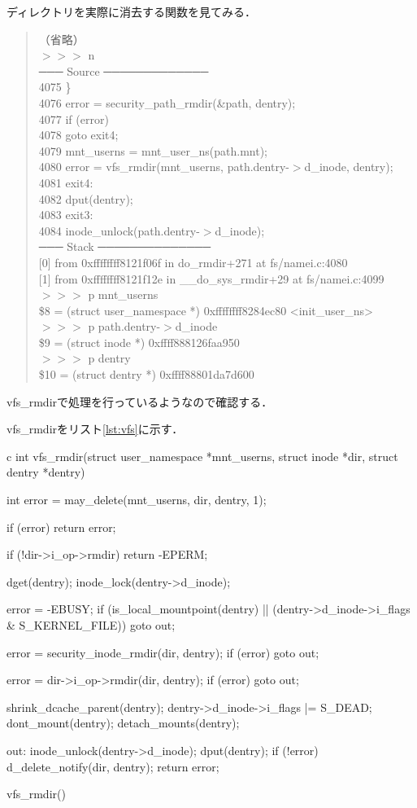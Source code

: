 ディレクトリを実際に消去する関数を見てみる．
\begin{quote}
（省略） \\
$>>>$ n \\
─── Source ─────────────
\\
 4075      \} \\
 4076      error = security\_path\_rmdir(\&path, dentry); \\
 4077      if (error) \\
 4078          goto exit4; \\
 4079      mnt\_userns = mnt\_user\_ns(path.mnt); \\
 4080      error = vfs\_rmdir(mnt\_userns, path.dentry-$>$d\_inode, dentry); \\
 4081  exit4: \\
 4082      dput(dentry); \\
 4083  exit3: \\
 4084      inode\_unlock(path.dentry-$>$d\_inode); \\
─── Stack ──────────────
\\
{[0]} from 0xffffffff8121f06f in do\_rmdir+271 at fs/namei.c:4080 \\
{[1]} from 0xffffffff8121f12e in \_\_do\_sys\_rmdir+29 at fs/namei.c:4099 \\
$>>>$ p mnt\_userns \\
\$8 = (struct user\_namespace *) 0xffffffff8284ec80 <init\_user\_ns> \\
$>>>$ p path.dentry-$>$d\_inode \\
\$9 = (struct inode *) 0xffff888126faa950 \\
$>>>$ p dentry \\
\$10 = (struct dentry *) 0xffff88801da7d600
\end{quote}

vfs\_rmdirで処理を行っているようなので確認する．

vfs\_rmdirをリスト\ref{lst:vfs}に示す．
\begin{longlisting}
\begin{myminted}{c}{}
int vfs_rmdir(struct user_namespace *mnt_userns, struct inode *dir,
         struct dentry *dentry)
{
	int error = may_delete(mnt_userns, dir, dentry, 1);

	if (error)
		return error;

	if (!dir->i_op->rmdir)
		return -EPERM;

	dget(dentry);
	inode_lock(dentry->d_inode);

	error = -EBUSY;
	if (is_local_mountpoint(dentry) ||
	    (dentry->d_inode->i_flags & S_KERNEL_FILE))
		goto out;

	error = security_inode_rmdir(dir, dentry);
	if (error)
		goto out;

	error = dir->i_op->rmdir(dir, dentry);
	if (error)
		goto out;

	shrink_dcache_parent(dentry);
	dentry->d_inode->i_flags |= S_DEAD;
	dont_mount(dentry);
	detach_mounts(dentry);

out:
	inode_unlock(dentry->d_inode);
	dput(dentry);
	if (!error)
		d_delete_notify(dir, dentry);
	return error;
}
\end{myminted}
\caption{vfs\_rmdir()}
\label{lst:vfs}
\end{longlisting}

